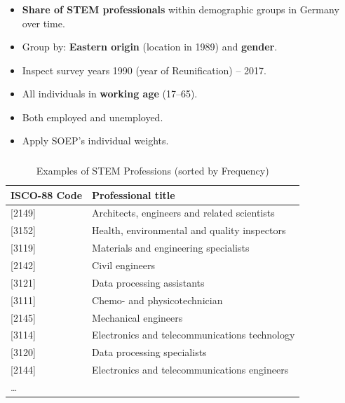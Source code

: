 \documentclass[11pt, aspectratio=1610, xcolor={dvipsnames}]{beamer}
\newcommand{\highlight}[1]{\textbf{\textcolor{PineGreen}{#1}}}
\begin{document}
	\begin{frame}
		\frametitle{}
		
		\begin{itemize}
			\item \highlight{Share of STEM professionals} within demographic groups in Germany over time.
			\item Group by: \highlight{Eastern origin} (location in 1989) and \highlight{gender}.
			\item Inspect survey years 1990 (year of Reunification) -- 2017.
			\item All individuals in \highlight{working age} (17--65).
			\item Both employed and unemployed.
			\item Apply SOEP's individual weights.
		\end{itemize}
		
	\end{frame}
	
	\begin{frame}
		\frametitle{}
		
		{\linespread{1}\small
			\begin{table}[h]
				\centering
				\caption{Examples of STEM Professions (sorted by Frequency)}
				\label{tab:stem_examples}
				
				\begin{tabular}{ll}
					\toprule
					ISCO-88 Code & Professional title\\
					\midrule
					{[2149]} & Architects, engineers and related scientists\\
					{[3152]} & Health, environmental and quality inspectors\\
					{[3119]} & Materials and engineering specialists\\
					{[2142]} & Civil engineers\\
					{[3121]} & Data processing assistants\\
					{[3111]} & Chemo- and physicotechnician\\
					{[2145]} & Mechanical engineers\\
					{[3114]} & Electronics and telecommunications technology\\
					{[3120]} & Data processing specialists\\
					{[2144]} & Electronics and telecommunications engineers\\
					… &\\
					\bottomrule
				\end{tabular}
			\end{table}
		}
		
	\end{frame}
	
\end{document}
